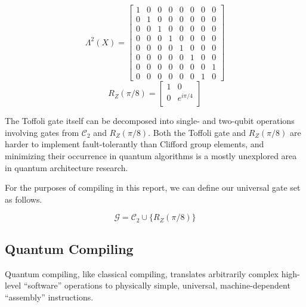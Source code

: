 \begin{equation}
\Lambda^2(X) = 
 \left[
  \begin{array}{cccccccc}
    1 & 0 & 0 & 0 & 0 & 0 & 0 & 0\\
    0 & 1 & 0 & 0 & 0 & 0 & 0 & 0\\
    0 & 0 & 1 & 0 & 0 & 0 & 0 & 0\\
    0 & 0 & 0 & 1 & 0 & 0 & 0 & 0\\
    0 & 0 & 0 & 0 & 1 & 0 & 0 & 0\\
    0 & 0 & 0 & 0 & 0 & 1 & 0 & 0\\
    0 & 0 & 0 & 0 & 0 & 0 & 0 & 1\\
    0 & 0 & 0 & 0 & 0 & 0 & 1 & 0
  \end{array} \right]
\end{equation}
\begin{equation}
 R_Z(\pi/8) = 
 \left[
  \begin{array}{cc}
    1 & 0 \\
    0 & e^{i\pi/4} \\
  \end{array} \right]
\end{equation}

The Toffoli gate itself can be decomposed into single- and two-qubit
operations involving gates from $\mathcal{C}_2$ and $R_Z(\pi/8)$.
Both the Toffoli gate and $R_Z(\pi/8)$ are harder to implement
fault-tolerantly than
Clifford group elements, and minimizing their occurrence in quantum
algorithms is a mostly unexplored area in quantum architecture research.

For the purposes of compiling in this report, we can define our universal gate set
as follows.

\begin{equation}
\mathcal{G} = \mathcal{C}_2 \cup \{ R_Z(\pi/8) \}
\end{equation}

\subsection{Quantum Compiling}
\label{subsec:compile}

Quantum compiling, like
classical compiling, translates arbitrarily complex high-level ``software''
operations to physically simple,
universal, machine-dependent ``assembly'' instructions.

